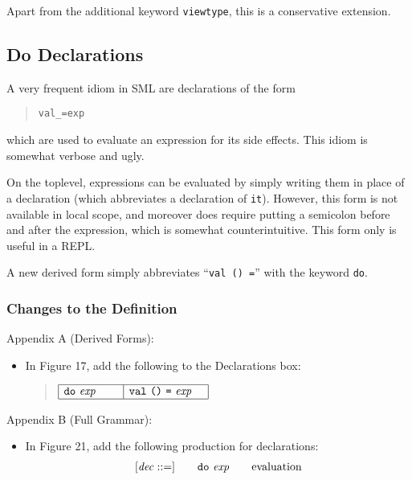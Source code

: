 \documentclass[twoside,titlepage]{article}
\begin{document}
\begin{appendix}
Apart from the additional keyword {\tt viewtype}, this is a conservative extension.


\subsection{Do Declarations}
\label{ext-do}

A very frequent idiom in SML are declarations of the form
\begin{quote}
\begin{alltt}
val _ = exp
\end{alltt}
\end{quote}
which are used to evaluate an expression for its side effects. This idiom is somewhat verbose and ugly.

On the toplevel, expressions can be evaluated by simply writing them in place of a declaration (which abbreviates a declaration of {\tt it}). However, this form is not available in local scope, and moreover does require putting a semicolon before and after the expression, which is somewhat counterintuitive. This form only is useful in a REPL.

A new derived form simply abbreviates ``{\tt val () =}'' with the keyword {\tt do}.

\subsubsection*{Changes to the Definition}

Appendix A (Derived Forms):
\begin{itemize}
\item In Figure 17, add the following to the Declarations box:
  \begin{quote}
  $\begin{array}{|l|l|}
  \hline
  {\tt{do}}~\mathit{exp}~~~~~~
  & {\tt{val}}~\mbox{\tt()}~\mbox{\tt=}~\mathit{exp}~~~ \\
  \hline
  \end{array}$
  \end{quote}
\end{itemize}

Appendix B (Full Grammar):
\begin{itemize}
\item In Figure 21, add the following production for declarations:
  $$
  \begin{array}{l@{\qquad}l@{\qquad}l}
  [\mathit{dec} ::=] & {\tt{do}}~\mathit{exp} & \textrm{evaluation}
  \end{array}
  $$
\end{itemize}


\end{appendix}
\end{document}
